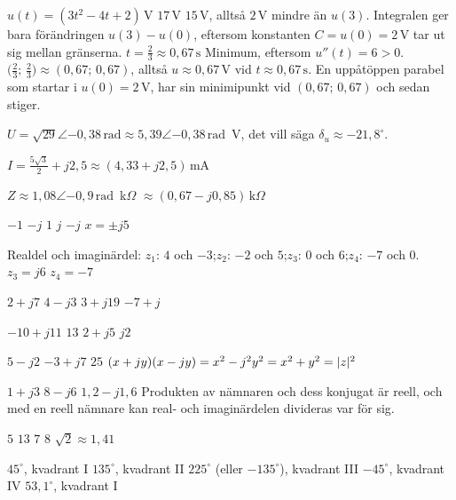 
\begin{facit}

  $u(t) = (3t^2 - 4t + 2)\,\text{V}$  $17\,\text{V}$
 $15\,\text{V}$, alltså $2\,\text{V}$ mindre än $u(3)$. Integralen ger bara förändringen
$u(3) - u(0)$, eftersom konstanten $C = u(0) = 2\,\text{V}$ tar ut sig mellan gränserna.
 $t = \frac{2}{3} \approx 0{,}67\,\text{s}$
 Minimum, eftersom $u''(t) = 6 > 0$.
 $\bigl(\frac{2}{3};\, \frac{2}{3}\bigr) \approx (0{,}67;\, 0{,}67)$, alltså
$u \approx 0{,}67\,\text{V}$ vid $t \approx 0{,}67\,\text{s}$.
 En uppåtöppen parabel som startar i $u(0) = 2\,\text{V}$, har sin minimipunkt vid
$(0{,}67;\, 0{,}67)$ och sedan stiger.

 $U = \sqrt{29}\angle{-0{,}38}\,\text{rad} \approx 5{,}39\angle{-0{,}38}\,\text{rad}$~V,
det vill säga $\delta_u \approx -21{,}8^{\circ}$.

 $I = \frac{5\sqrt{3}}{2} + j2{,}5 \approx (4{,}33 + j2{,}5)\,\text{mA}$

 $Z \approx 1{,}08\angle{-0{,}9}\,\text{rad}$~k$\Omega$
$\approx (0{,}67 - j0{,}85)\,\text{k}\Omega$

  $-1$  $-j$  $1$  $j$  $-j$  $x = \pm j5$

  Realdel och imaginärdel: $z_1$: $4$ och $-3$;\enspace $z_2$: $-2$ och
$5$;\enspace $z_3$: $0$ och $6$;\enspace $z_4$: $-7$ och $0$.
 $z_3 = j6$  $z_4 = -7$

  $2 + j7$  $4 - j3$  $3 + j19$  $-7 + j$

  $-10 + j11$  $13$  $2 + j5$  $j2$

  $5 - j2$  $-3 + j7$  $25$
 $(x + jy)(x - jy) = x^2 - j^2y^2 = x^2 + y^2 = \lvert z\rvert^2$

  $1 + j3$  $8 - j6$  $1{,}2 - j1{,}6$
 Produkten av nämnaren och dess konjugat är reell, och med en reell nämnare kan real- och
imaginärdelen divideras var för sig.

  $5$  $13$  $7$  $8$  $\sqrt{2} \approx 1{,}41$

  $45^{\circ}$, kvadrant I  $135^{\circ}$, kvadrant II
 $225^{\circ}$ (eller $-135^{\circ}$), kvadrant III  $-45^{\circ}$, kvadrant IV
 $53{,}1^{\circ}$, kvadrant I


\end{facit}
